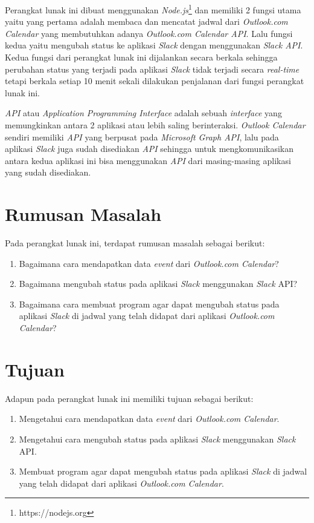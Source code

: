 Perangkat lunak ini dibuat menggunakan \textit{Node.js}\footnote{https://nodejs.org} dan memiliki 2 fungsi utama yaitu yang pertama adalah membaca dan mencatat jadwal dari \textit{Outlook.com Calendar} yang membutuhkan adanya \textit{Outlook.com Calendar API}. Lalu fungsi kedua yaitu mengubah status ke aplikasi \textit{Slack} dengan menggunakan \textit{Slack API}. Kedua fungsi dari perangkat lunak ini dijalankan secara berkala sehingga perubahan status yang terjadi pada aplikasi \textit{Slack} tidak terjadi secara \textit{real-time} tetapi berkala setiap 10 menit sekali dilakukan penjalanan dari fungsi perangkat lunak ini.  

\textit{API} atau \textit{Application Programming Interface} adalah sebuah \textit{interface} yang memungkinkan antara 2 aplikasi atau lebih saling berinteraksi. \textit{Outlook Calendar} sendiri memiliki \textit{API} yang berpusat pada \textit{Microsoft Graph API}, lalu pada aplikasi \textit{Slack} juga sudah disediakan \textit{API} sehingga untuk mengkomunikasikan antara kedua aplikasi ini bisa menggunakan \textit{API} dari masing-masing aplikasi yang sudah disediakan. 

\section{Rumusan Masalah}
\label{sec:rumusan}
Pada perangkat lunak ini, terdapat rumusan masalah sebagai berikut:
\begin{enumerate}
	\item Bagaimana cara mendapatkan data \textit{event} dari \textit{Outlook.com Calendar}?
	\item Bagaimana mengubah status pada aplikasi \textit{Slack} menggunakan \textit{Slack} API?  
	\item Bagaimana cara membuat program agar dapat mengubah status pada aplikasi \textit{Slack} di jadwal yang telah didapat dari aplikasi \textit{Outlook.com Calendar}? 
	
\end{enumerate}

\section{Tujuan}
\label{sec:tujuan}
Adapun pada perangkat lunak ini memiliki tujuan sebagai berikut:
\begin{enumerate}
	\item Mengetahui cara mendapatkan data \textit{event} dari \textit{Outlook.com Calendar}.   
	\item Mengetahui cara mengubah status pada aplikasi \textit{Slack} menggunakan \textit{Slack} API. 
	\item Membuat program agar dapat mengubah status pada aplikasi \textit{Slack} di jadwal yang telah didapat dari aplikasi \textit{Outlook.com Calendar}.  
\end{enumerate}

